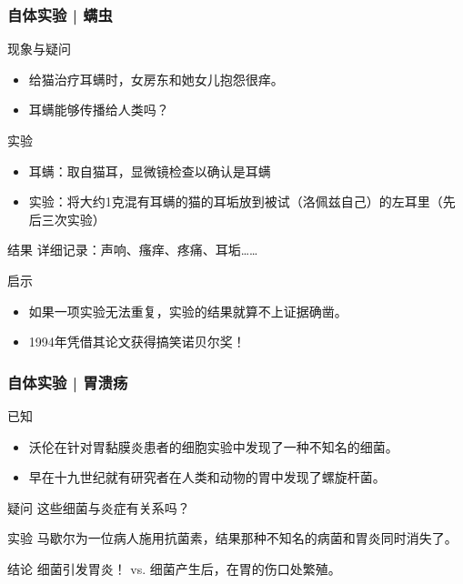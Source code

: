 \begin{frame}
  \frametitle{自体实验 | 螨虫}
  \begin{block}{现象与疑问}
    \begin{itemize}
      \item 给猫治疗耳螨时，女房东和她女儿抱怨很痒。
      \item 耳螨能够传播给人类吗？
    \end{itemize}
  \end{block}
  \vspace{-0.5em}
  \pause
  \begin{block}{实验}
    \begin{itemize}
      \item 耳螨：取自猫耳，显微镜检查以确认是耳螨
      \item 实验：将大约1克混有耳螨的猫的耳垢放到被试（洛佩兹自己）的左耳里（先后三次实验）
    \end{itemize}
  \end{block}
  \vspace{-0.5em}
  \pause
  \begin{block}{结果}
    详细记录：声响、瘙痒、疼痛、耳垢……
  \end{block}
  \vspace{-0.5em}
  \pause
  \begin{block}{启示}
    \begin{itemize}
      \item \alert{如果一项实验无法重复，实验的结果就算不上证据确凿。}
      \item 1994年凭借其论文获得搞笑诺贝尔奖！
    \end{itemize}
  \end{block}
\end{frame}

\begin{frame}
  \frametitle{自体实验 | 胃溃疡}
  \begin{block}{已知}
    \begin{itemize}
      \item 沃伦在针对胃黏膜炎患者的细胞实验中发现了一种不知名的细菌。
      \item 早在十九世纪就有研究者在人类和动物的胃中发现了螺旋杆菌。
    \end{itemize}
  \end{block}
  \pause
  \begin{block}{疑问}
    这些细菌与炎症有关系吗？
  \end{block}
  \pause
  \begin{block}{实验}
    马歇尔为一位病人施用抗菌素，结果那种不知名的病菌和胃炎同时消失了。
  \end{block}
  \pause
  \begin{block}{结论}
    细菌引发胃炎！ vs. 细菌产生后，在胃的伤口处繁殖。
  \end{block}
\end{frame}

